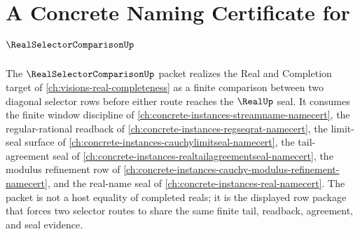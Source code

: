 \chapter{A Concrete Naming Certificate for $\RealSelectorComparisonUp$}
\label{ch:concrete-instances-real-selector-comparison-namecert}

The $\RealSelectorComparisonUp$ packet realizes the Real and Completion target of \autoref{ch:visions-real-completeness} as a finite comparison between two diagonal selector rows before either route reaches the $\RealUp$ seal. It consumes the finite window discipline of \autoref{ch:concrete-instances-streamname-namecert}, the regular-rational readback of \autoref{ch:concrete-instances-regseqrat-namecert}, the limit-seal surface of \autoref{ch:concrete-instances-cauchylimitseal-namecert}, the tail-agreement seal of \autoref{ch:concrete-instances-realtailagreementseal-namecert}, the modulus refinement row of \autoref{ch:concrete-instances-cauchy-modulus-refinement-namecert}, and the real-name seal of \autoref{ch:concrete-instances-real-namecert}. The packet is not a host equality of completed reals; it is the displayed row package that forces two selector routes to share the same finite tail, readback, agreement, and seal evidence.

